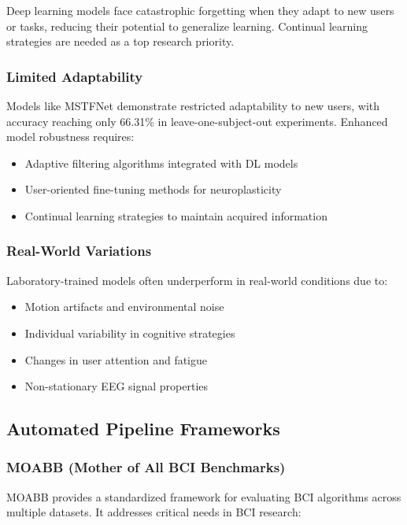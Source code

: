 \documentclass[12pt]{article}
\begin{document}
Deep learning models face catastrophic forgetting when they adapt to new users or tasks, reducing their potential to generalize learning. Continual learning strategies are needed as a top research priority.

\subsubsection{Limited Adaptability}

Models like MSTFNet demonstrate restricted adaptability to new users, with accuracy reaching only 66.31\% in leave-one-subject-out experiments. Enhanced model robustness requires:
\begin{itemize}
    \item Adaptive filtering algorithms integrated with DL models
    \item User-oriented fine-tuning methods for neuroplasticity
    \item Continual learning strategies to maintain acquired information
\end{itemize}

\subsubsection{Real-World Variations}

Laboratory-trained models often underperform in real-world conditions due to:
\begin{itemize}
    \item Motion artifacts and environmental noise
    \item Individual variability in cognitive strategies
    \item Changes in user attention and fatigue
    \item Non-stationary EEG signal properties
\end{itemize}

\subsection{Automated Pipeline Frameworks}

\subsubsection{MOABB (Mother of All BCI Benchmarks)}

MOABB provides a standardized framework for evaluating BCI algorithms across multiple datasets. It addresses critical needs in BCI research:
\end{document}
